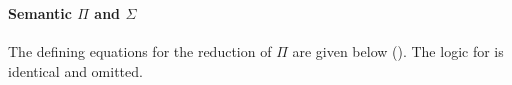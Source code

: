 \documentclass[sigplan,screen]{acmart}
\begin{document}
\begin{AgdaAlign}
\begin{code}%
%
\>[2]\AgdaSpace{}%
\AgdaSymbol{:}\AgdaSpace{}%
\AgdaSpace{}%
\AgdaSpace{}%
\AgdaSpace{}%
\AgdaSpace{}%
\AgdaSpace{}%
\AgdaSpace{}%
\AgdaSymbol{((}\AgdaSpace{}%
\AgdaSpace{}%
\AgdaSymbol{)}\AgdaSpace{}%
\AgdaSpace{}%
\AgdaSymbol{)}\<%
\\
%
\>[2]\AgdaSpace{}%
\AgdaSpace{}%
\AgdaSymbol{=}\AgdaSpace{}%
\AgdaSpace{}%
\AgdaSpace{}%
\AgdaSpace{}%
\AgdaSpace{}%
\AgdaSpace{}%
\AgdaSpace{}%
\AgdaSymbol{(}\AgdaSpace{}%
\AgdaSpace{}%
\AgdaSymbol{)}\<%
\\
%
\>[2]\AgdaSpace{}%
\AgdaSymbol{:}%
\>[1980I]\AgdaSpace{}%
\AgdaSpace{}%
\AgdaOperator{\AgdaInductiveConstructor{R[}}\AgdaSpace{}%
\AgdaSpace{}%
\AgdaSpace{}%
\AgdaSpace{}%
\AgdaOperator{\AgdaInductiveConstructor{]}}\AgdaSpace{}%
\<%
\\
\>[1980I][@{}l@{\AgdaIndent{0}}]%
\>[11]\AgdaSpace{}%
\AgdaSpace{}%
\AgdaSpace{}%
\AgdaSpace{}%
\AgdaSpace{}%
\AgdaSpace{}%
\AgdaOperator{\AgdaInductiveConstructor{R[}}\AgdaSpace{}%
\AgdaSpace{}%
\AgdaOperator{\AgdaInductiveConstructor{]}}\<%
\\
%
\>[2]\AgdaSpace{}%
\AgdaSpace{}%
\AgdaSpace{}%
\AgdaSymbol{=}\AgdaSpace{}%
\AgdaSpace{}%
\AgdaSpace{}%
\AgdaSpace{}%
\<%
\end{code}
\end{AgdaAlign}

\paragraph{Semantic $\Pi$ and $\Sigma$} 
\label{sec:semantic-Pi}
The defining equations for the reduction of $\Pi$ are given below (). The logic for  is identical and omitted.
\end{document}
